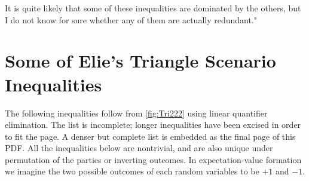 {It is quite likely that some of these inequalities are dominated by the others, but I do not know for sure whether any of them are actually redundant."



\section{Some of Elie's Triangle Scenario Inequalities}

The following inequalities follow from \cref{fig:Tri222} using linear quantifier elimination. The list is incomplete; longer inequalities have been excised in order to fit the page. A denser but complete list is embedded as the final page of this PDF. All the inequalities below are nontrivial, and are also unique under permutation of the parties or inverting outcomes. In expectation-value formation we imagine the two possible outcomes of each random variables to be $+1$ and $-1$.

}
